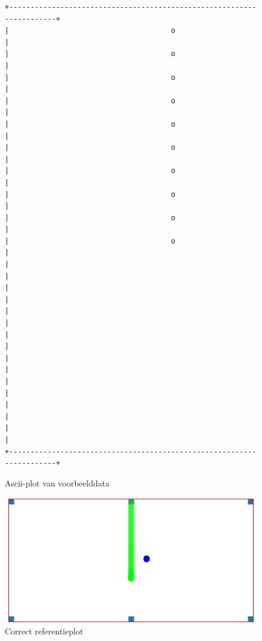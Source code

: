\documentclass{article}
\begin{document}
\begin{figure}
\begin{verbatim}
+----------------------------------------------------------------------+ 
|                                      o                               | 
|                                      o                               | 
|                                      o                               | 
|                                      o                               | 
|                                      o                               | 
|                                      o                               | 
|                                      o                               | 
|                                      o                               | 
|                                      o                               | 
|                                      o                               | 
|                                                                      | 
|                                                                      | 
|                                                                      | 
|                                                                      | 
|                                                                      | 
|                                                                      | 
|                                                                      | 
|                                                                      | 
+----------------------------------------------------------------------+ 
\end{verbatim}
\caption{Ascii-plot van voorbeelddata}
\label{fig:ascii-box}
\end{figure}
\begin{figure}
  \includegraphics[width=\linewidth]{sampleplot.jpg}
  \caption{Correct referentieplot}
  \label{fig:exampleplot}
\end{figure}
\newpage
\end{document}
